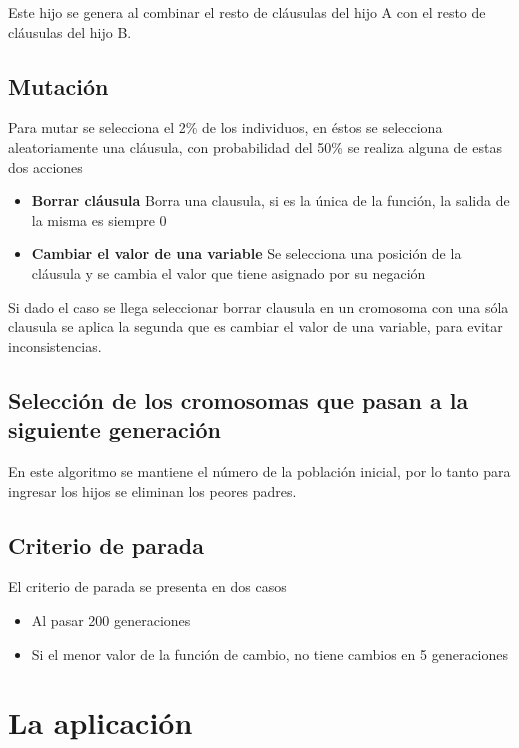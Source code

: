 \documentclass[a4paper]{article}
\begin{document}
Este hijo se genera al combinar el resto de cláusulas del hijo A con el resto de cláusulas del hijo B.

\subsection{Mutación}

Para mutar se selecciona el 2\% de los individuos, en éstos se selecciona aleatoriamente una cláusula, con probabilidad del 50\% se realiza alguna de estas dos acciones

\begin{itemize}
	\item \textbf{Borrar cláusula} Borra una clausula, si es la única de la función, la salida de la misma es siempre 0
	\item \textbf{Cambiar el valor de una variable} Se selecciona una posición de la cláusula y se cambia el valor que tiene asignado por su negación
\end{itemize}

Si dado el caso se llega seleccionar borrar clausula en un cromosoma con una sóla clausula se aplica la segunda que es cambiar el valor de una variable, para evitar inconsistencias.	

\subsection{Selección de los cromosomas que pasan a la siguiente generación}

En este algoritmo se mantiene el número de la población inicial, por lo tanto para ingresar los hijos se eliminan los peores padres.

\subsection{Criterio de parada}

El criterio de parada se presenta en dos casos

\begin{itemize}
	\item Al pasar 200 generaciones
	\item Si el menor valor de la función de cambio, no tiene cambios en 5 generaciones
\end{itemize}

\section{La aplicación}
\end{document}
